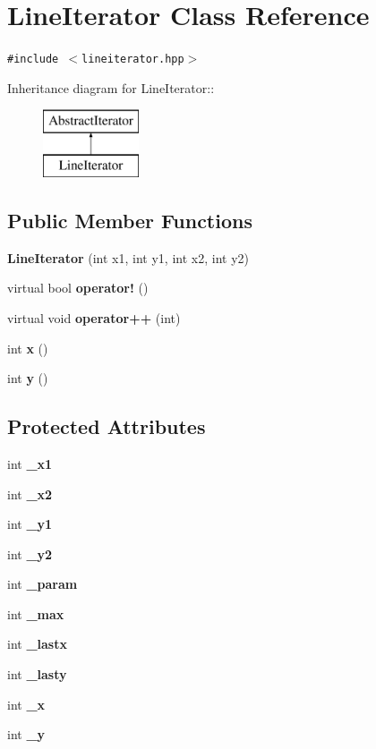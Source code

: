 \section{Line\-Iterator Class Reference}
\label{classLineIterator}
{\tt \#include $<$lineiterator.hpp$>$}

Inheritance diagram for Line\-Iterator::\begin{figure}[H]
\begin{center}
\leavevmode
\includegraphics[height=2cm]{classLineIterator}
\end{center}
\end{figure}
\subsection*{Public Member Functions}
\begin{CompactItemize}
\item 
{\bf Line\-Iterator} (int x1, int y1, int x2, int y2)
\item 
virtual bool {\bf operator!} ()
\item 
virtual void {\bf operator++} (int)
\item 
int {\bf x} ()
\item 
int {\bf y} ()
\end{CompactItemize}
\subsection*{Protected Attributes}
\begin{CompactItemize}
\item 
int {\bf \_\-x1}
\item 
int {\bf \_\-x2}
\item 
int {\bf \_\-y1}
\item 
int {\bf \_\-y2}
\item 
int {\bf \_\-param}
\item 
int {\bf \_\-max}
\item 
int {\bf \_\-lastx}
\item 
int {\bf \_\-lasty}
\item 
int {\bf \_\-x}
\item 
int {\bf \_\-y}
\end{CompactItemize}


